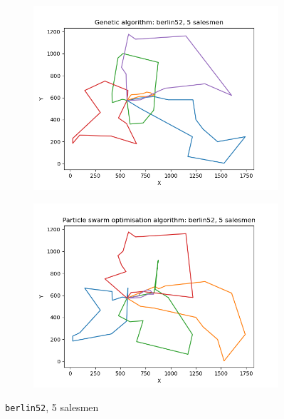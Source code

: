 \documentclass[conference]{IEEEtran}
\begin{document}
\begin{figure}[h]
    \centering
    \begin{subfigure}{.5\textwidth}
      \centering
      \includegraphics[width=\textwidth]{images/Genetic algorithm: berlin52, 5 salesmen.png}
    \end{subfigure}%
    \begin{subfigure}{.5\textwidth}
      \centering
      \includegraphics[width=\textwidth]{images/Particle swarm optimisation algorithm: berlin52, 5 salesmen.png}
    \end{subfigure}%
    \caption{\texttt{berlin52}, 5 salesmen} \label{berlin52, 5 salesmen}
\end{figure}
\end{document}

